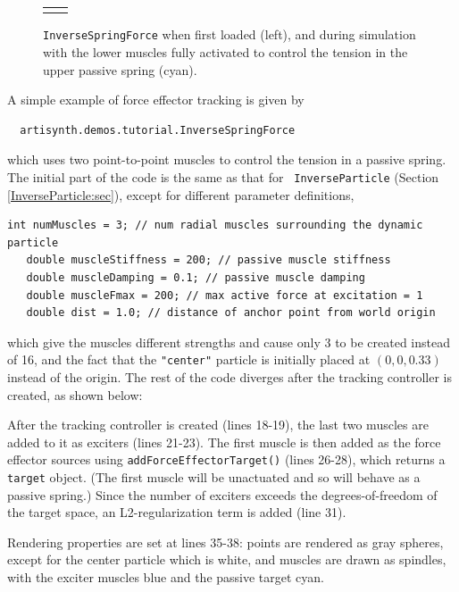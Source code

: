 \begin{figure}[ht]
\begin{center}
\begin{tabular}{cc}
   \fi
\end{tabular}
\end{center}
\caption{{\tt InverseSpringForce} when first loaded (left), and
during simulation with the lower muscles fully activated to 
control the tension in the upper passive spring (cyan).}
\label{InverseSpringForce:fig}
\end{figure}

A simple example of force effector tracking is given by
%
\begin{verbatim}
  artisynth.demos.tutorial.InverseSpringForce
\end{verbatim}
%
which uses two point-to-point muscles to control the tension in a passive
spring. The initial part of the code is the same as that for {\tt
InverseParticle} (Section \ref{InverseParticle:sec}), except for different
parameter definitions,
%
\begin{lstlisting}[]
   int numMuscles = 3; // num radial muscles surrounding the dynamic particle
   double muscleStiffness = 200; // passive muscle stiffness
   double muscleDamping = 0.1; // passive muscle damping
   double muscleFmax = 200; // max active force at excitation = 1   
   double dist = 1.0; // distance of anchor point from world origin
\end{lstlisting}
%
which give the muscles different strengths and cause only 3 to be created
instead of 16, and the fact that the {\tt "center"} particle is initially placed
at $(0, 0, 0.33)$ instead of the origin. The rest of the code diverges after
the tracking controller is created, as shown below:
%
\lstset{numbers=left}
\iflatexml

\else
{}

\fi
\lstset{numbers=none}
%
After the tracking controller is created (lines 18-19), the last two muscles
are added to it as exciters (lines 21-23). The first muscle is then added as
the force effector sources using {\tt addForceEffectorTarget()} (lines 26-28),
which returns a {\tt target} object. (The first muscle will be unactuated and
so will behave as a passive spring.) Since the number of exciters exceeds the
degrees-of-freedom of the target space, an L2-regularization term is added
(line 31).

Rendering properties are set at lines 35-38: points are rendered
as gray spheres, except for the center particle which is white,
and muscles are drawn as spindles, with the exciter muscles
blue and the passive target cyan.

